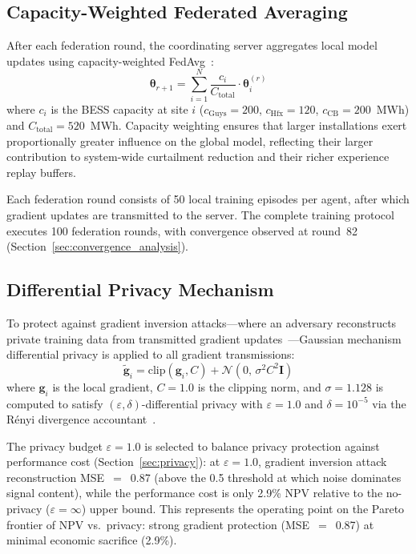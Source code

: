 \documentclass[journal]{IEEEtran}
\begin{document}
\subsection{Capacity-Weighted Federated Averaging}

After each federation round, the coordinating server aggregates local
model updates using capacity-weighted FedAvg~\cite{mcmahan2017}:
\begin{equation}
  \boldsymbol{\theta}_{r+1} = \sum_{i=1}^{N}
    \frac{c_i}{C_{\mathrm{total}}} \cdot \boldsymbol{\theta}_i^{(r)}
  \label{eq:fedavg}
\end{equation}
where $c_i$ is the BESS capacity at site $i$
($c_{\mathrm{Guys}} = 200$, $c_{\mathrm{Hfx}} = 120$,
$c_{\mathrm{CB}} = 200$~MWh) and $C_{\mathrm{total}} = 520$~MWh.
Capacity weighting ensures that larger installations exert
proportionally greater influence on the global model, reflecting their
larger contribution to system-wide curtailment reduction and their
richer experience replay buffers.

Each federation round consists of 50 local training episodes per
agent, after which gradient updates are transmitted to the server. The
complete training protocol executes 100 federation rounds, with
convergence observed at round~82 (Section~\ref{sec:convergence_analysis}).

\subsection{Differential Privacy Mechanism}

To protect against gradient inversion attacks---where an adversary
reconstructs private training data from transmitted gradient
updates~\cite{zhu2019deep}---Gaussian mechanism differential privacy is
applied to all gradient transmissions:
\begin{equation}
  \tilde{\mathbf{g}}_i =
    \mathrm{clip}(\mathbf{g}_i, C) +
    \mathcal{N}(0,\,\sigma^2 C^2 \mathbf{I})
  \label{eq:dp}
\end{equation}
where $\mathbf{g}_i$ is the local gradient, $C = 1.0$ is the clipping
norm, and $\sigma = 1.128$ is computed to satisfy
$(\varepsilon,\delta)$-differential privacy with $\varepsilon = 1.0$
and $\delta = 10^{-5}$ via the Rényi divergence
accountant~\cite{mironov2017renyi}.

The privacy budget $\varepsilon = 1.0$ is selected to balance privacy
protection against performance cost (Section~\ref{sec:privacy}): at
$\varepsilon = 1.0$, gradient inversion attack reconstruction
MSE~$=$~0.87 (above the 0.5 threshold at which noise dominates
signal content), while the performance cost is only 2.9\% NPV
relative to the no-privacy ($\varepsilon = \infty$) upper bound.
This represents the operating point on the Pareto frontier of NPV
vs.\ privacy: strong gradient protection (MSE~$=$~0.87) at minimal
economic sacrifice (2.9\%).
\end{document}
